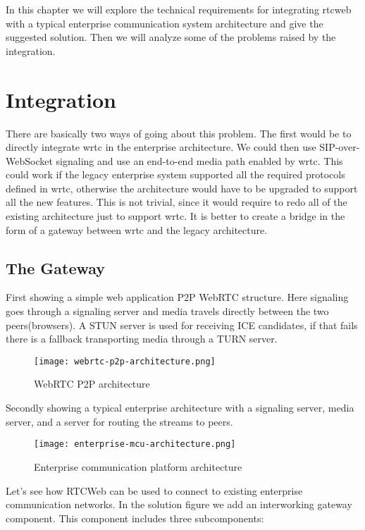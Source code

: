In this chapter we will explore the technical requirements for integrating \gls{rtcweb} with a typical enterprise communication system architecture and give the suggested solution. Then we will analyze some of the problems raised by the integration.

\section{Integration}
There are basically two ways of going about this problem. The first would be to directly integrate \gls{wrtc} in the enterprise architecture. We could then use SIP-over-WebSocket signaling and use an end-to-end media path enabled by \gls{wrtc}. This could work if the legacy enterprise system supported all the required protocols defined in \gls{wrtc}, otherwise the architecture would have to be upgraded to support all the new features. This is not trivial, since it would require to redo all of the existing architecture just to support \gls{wrtc}. It is better to create a bridge in the form of a gateway between \gls{wrtc} and the legacy architecture.

\subsection{The Gateway}
First showing a simple web application P2P WebRTC structure. Here signaling goes through a signaling server and media travels directly between the two peers(browsers). A STUN server is used for receiving ICE candidates, if that fails there is a fallback transporting media through a TURN server.

\begin{figure}[here]
\centerline{\texttt{[image: webrtc-p2p-architecture.png]}}
\caption{WebRTC P2P architecture}
\label{fig:jsep}
\end{figure}

Secondly showing a typical enterprise architecture with a signaling server, media server, and a server for routing the streams to peers.

\begin{figure}[here]
\centerline{\texttt{[image: enterprise-mcu-architecture.png]}}
\caption{Enterprise communication platform architecture}
\label{fig:VirtualArenaArchitecture}
\end{figure}

Let's see how RTCWeb can be used to connect to existing enterprise communication networks. In the solution figure we add an interworking gateway component. This component includes three subcomponents:

